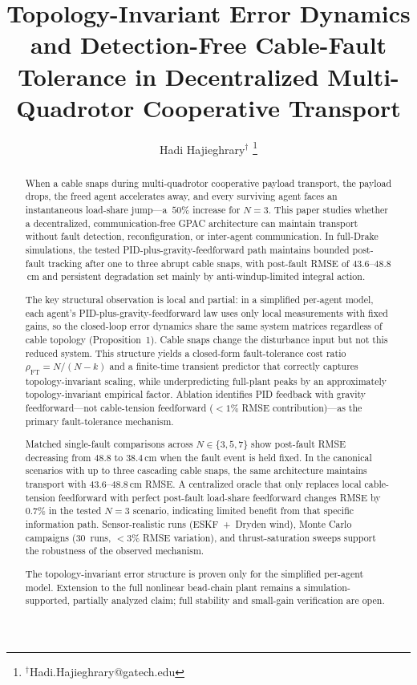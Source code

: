 \documentclass[lettersize,journal]{IEEEtran}
\title{Topology-Invariant Error Dynamics and Detection-Free Cable-Fault Tolerance in Decentralized Multi-Quadrotor Cooperative Transport}
\author{Hadi Hajieghrary$^{\dagger}$
\thanks{$^{\dagger}$Hadi.Hajieghrary@gatech.edu}}
\begin{document}
\maketitle

\begin{abstract}
When a cable snaps during multi-quadrotor cooperative payload transport, the payload drops, the freed agent accelerates away, and every surviving agent faces an instantaneous load-share jump---a~$50\%$ increase for $N{=}3$. This paper studies whether a decentralized, communication-free GPAC architecture can maintain transport without fault detection, reconfiguration, or inter-agent communication. In full-Drake simulations, the tested PID-plus-gravity-feedforward path maintains bounded post-fault tracking after one to three abrupt cable snaps, with post-fault RMSE of $43.6$--$48.8$\,cm and persistent degradation set mainly by anti-windup-limited integral action.

The key structural observation is local and partial: in a simplified per-agent model, each agent's PID-plus-gravity-feedforward law uses only local measurements with fixed gains, so the closed-loop error dynamics share the same system matrices regardless of cable topology (Proposition~1). Cable snaps change the disturbance input but not this reduced system. This structure yields a closed-form fault-tolerance cost ratio $\rho_{\mathrm{FT}} = N/(N{-}k)$ and a finite-time transient predictor that correctly captures topology-invariant scaling, while underpredicting full-plant peaks by an approximately topology-invariant empirical factor. Ablation identifies PID feedback with gravity feedforward---not cable-tension feedforward ($<\!1\%$ RMSE contribution)---as the primary fault-tolerance mechanism.

Matched single-fault comparisons across $N \in \{3, 5, 7\}$ show post-fault RMSE decreasing from $48.8$ to $38.4$\,cm when the fault event is held fixed. In the canonical scenarios with up to three cascading cable snaps, the same architecture maintains transport with $43.6$--$48.8$\,cm RMSE. A centralized oracle that only replaces local cable-tension feedforward with perfect post-fault load-share feedforward changes RMSE by $0.7\%$ in the tested $N{=}3$ scenario, indicating limited benefit from that specific information path. Sensor-realistic runs (ESKF~+~Dryden wind), Monte Carlo campaigns ($30$~runs, $<\!3\%$ RMSE variation), and thrust-saturation sweeps support the robustness of the observed mechanism.

The topology-invariant error structure is proven only for the simplified per-agent model. Extension to the full nonlinear bead-chain plant remains a simulation-supported, partially analyzed claim; full stability and small-gain verification are open.
\end{abstract}
\end{document}
